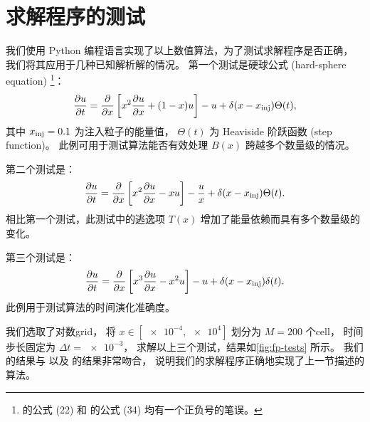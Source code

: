 \section{求解程序的测试}

我们使用 Python 编程语言实现了以上数值算法，为了测试求解程序是否正确，
我们将其应用于几种已知解析解的情况\cite{park1996,donnert2014}。
第一个测试是硬球公式 (hard-sphere equation) \footnote{%
   的公式 (22) 和  的公式 (34)
  均有一个正负号的笔误。
}：
\begin{equation}
  \label{eq:fp-test1}
  \frac{\partial u}{\partial t} = \frac{\partial }{\partial x} \left[ x^2 \frac{\partial u}{\partial x} + (1-x) u \right]
    - u + \delta(x-x_{\mathrm{inj}}) \Theta(t) ,
\end{equation}
其中 $x_{\mathrm{inj}} = 0.1$ 为注入粒子的能量值，
$\Theta(t)$ 为 Heaviside 阶跃函数 (step function)。
此例可用于测试算法能否有效处理 $B(x)$ 跨越多个数量级的情况。

第二个测试是：
\begin{equation}
  \label{eq:fp-test2}
  \frac{\partial u}{\partial t} = \frac{\partial }{\partial x} \left[ x^2 \frac{\partial u}{\partial x} - x u \right]
    - \frac{u}{x} + \delta(x-x_{\mathrm{inj}}) \Theta(t) .
\end{equation}
相比第一个测试，此测试中的逃逸项 $T(x)$ 增加了能量依赖而具有多个数量级的变化。

第三个测试是：
\begin{equation}
  \label{eq:fp-test3}
  \frac{\partial u}{\partial t} = \frac{\partial }{\partial x} \left[ x^3 \frac{\partial u}{\partial x} - x^2 u \right]
    - u + \delta(x-x_{\mathrm{inj}}) \delta(t) .
\end{equation}
此例用于测试算法的时间演化准确度。

我们选取了对数\ac{grid}，
将 $x \in [\num{e-4}, \num{e4}]$ 划分为 $M = 200$ 个\ac{cell}，
时间步长固定为 $\Delta t = \num{e-3}$，
求解以上三个测试，结果如\autoref{fig:fp-tests} 所示。
我们的结果与  以及  的结果非常吻合，
说明我们的求解程序正确地实现了上一节描述的算法。

